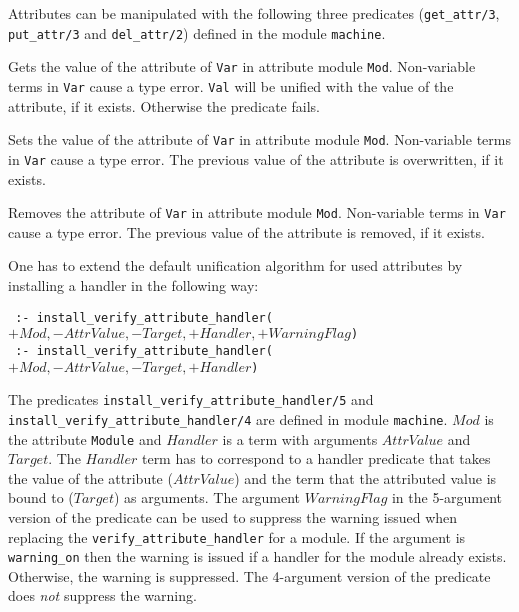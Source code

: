 Attributes can be manipulated with the following three predicates
(\texttt{get\_attr/3}, \texttt{put\_attr/3} and \texttt{del\_attr/2})
defined in the module \texttt{machine}.

\begin{description}
%
Gets the value of the attribute of \texttt{Var} in attribute module
\texttt{Mod}. Non-variable terms in \texttt{Var} cause a type
error. \texttt{Val} will be unified with the value of the attribute,
if it exists. Otherwise the predicate fails.

%
Sets the value of the attribute of \texttt{Var} in attribute module
\texttt{Mod}. Non-variable terms in \texttt{Var} cause a type
error. The previous value of the attribute is overwritten, if it
exists.

%
Removes the attribute of \texttt{Var} in attribute module
\texttt{Mod}. Non-variable terms in \texttt{Var} cause a type
error. The previous value of the attribute is removed, if it exists.
\end{description}

One has to extend the default unification algorithm for used
attributes by installing a handler in the following way:

\noindent
{\tt
:- install\_verify\_attribute\_handler($+Mod, -AttrValue, -Target, +Handler, +WarningFlag$)}
\\
{\tt
  :- install\_verify\_attribute\_handler($+Mod, -AttrValue, -Target, +Handler$)}

\noindent The
predicates
\texttt{install\_verify\_attribute\_handler/5}
and
\texttt{install\_verify\_attribute\_handler/4}
are defined in module \texttt{machine}. $Mod$ is the
attribute {\tt Module} and $Handler$ is a term with arguments
$AttrValue$ and $Target$. The $Handler$ term has to correspond to a
handler predicate that takes the value of the attribute ($AttrValue$)
and the term that the attributed value is bound to ($Target$) as
arguments. The argument $WarningFlag$ in the 5-argument version of the
predicate can be used to suppress the warning issued when replacing the
{\tt verify\_attribute\_handler} for a module. If the argument is
{\tt warning\_on} then the warning is issued if a handler for the module
already exists. Otherwise, the warning is suppressed. 
The 4-argument version of the predicate does \emph{not} suppress the
warning. 

